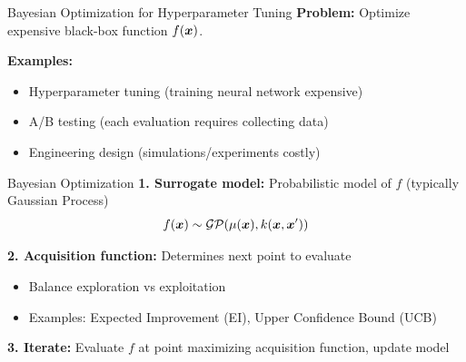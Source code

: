 \documentclass[aspectratio=169]{beamer}
\begin{document}
\begin{frame}{Bayesian Optimization for Hyperparameter Tuning}
  \textbf{Problem:} Optimize expensive black-box function $f(\boldsymbol{x})$.

  \vspace{0.5em}

  \textbf{Examples:}
  \begin{itemize}
    \item Hyperparameter tuning (training neural network expensive)
    \item A/B testing (each evaluation requires collecting data)
    \item Engineering design (simulations/experiments costly)
  \end{itemize}

  \vspace{0.5em}

  \begin{definitionbox}{Bayesian Optimization}
    \textbf{1. Surrogate model:} Probabilistic model of $f$ (typically Gaussian Process)
    $$f(\boldsymbol{x}) \sim \mathcal{GP}(\mu(\boldsymbol{x}), k(\boldsymbol{x}, \boldsymbol{x}'))$$

    \textbf{2. Acquisition function:} Determines next point to evaluate
    \begin{itemize}
      \item Balance exploration vs exploitation
      \item Examples: Expected Improvement (EI), Upper Confidence Bound (UCB)
    \end{itemize}

    \textbf{3. Iterate:} Evaluate $f$ at point maximizing acquisition function, update model
  \end{definitionbox}
\end{frame}
\end{document}
